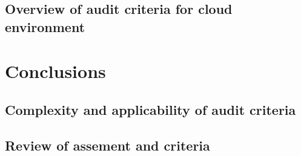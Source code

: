 \documentclass{article}
\begin{document}
\subsection{Overview of audit criteria for cloud environment}
\blindtext[2]
\section{Conclusions}
\blindtext[2]
\subsection{Complexity and applicability of audit criteria}
\blindtext[2]
\subsection{Review of assement and criteria}
\blindtext[2]
\end{document}
